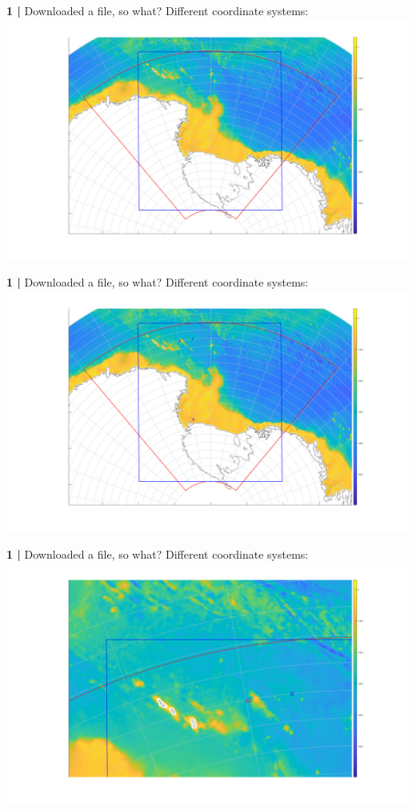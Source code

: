 \begin{frame}{\textbf{1 |} Downloaded a file, so what?}
    Different coordinate systems:
    \includegraphics[scale=0.15]{images/winter_school_domain_1.png}
\end{frame}


\begin{frame}{\textbf{1 |} Downloaded a file, so what?}
    Different coordinate systems:
    \includegraphics[scale=0.15]{images/winter_school_domain_2.png}
\end{frame}


\begin{frame}{\textbf{1 |} Downloaded a file, so what?}
    Different coordinate systems:
    \includegraphics[scale=0.15]{images/winter_school_domain_3.png}
\end{frame}


